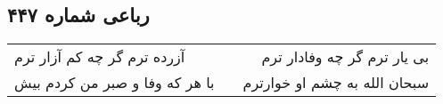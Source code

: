 \begin{center}
\section*{رباعی شماره ۴۴۷}
\label{sec:sh447}
\begin{longtable}{l p{0.5cm} r}
آزرده ترم گر چه کم آزار ترم
&&
بی یار ترم گر چه وفادار ترم
\\
با هر که وفا و صبر من کردم بیش
&&
سبحان الله به چشم او خوارترم
\\
\end{longtable}
\end{center}
